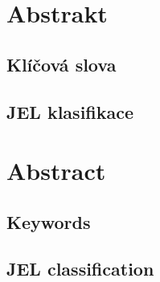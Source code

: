 \hypersetup{pageanchor=true}
\cleardoublepage
\pagestyle{plain}
\openright
\vspace*{\fill}
\section*{\PodekovaniText}
\noindent
\Podekovani
\vspace{1cm}


\openright
\section*{Abstrakt}
\noindent
\Abstrakt
\subsection*{Klíčová slova}
\noindent
\KlicovaSlova
\subsection*{JEL klasifikace}
\noindent
\JEL

\bigskip\bigskip\bigskip\bigskip\bigskip
\section*{Abstract}
\noindent
\AbstraktEN
\subsection*{Keywords}
\noindent
\KlicovaSlovaEN
\subsection*{JEL classification}
\noindent
\JEL

\openright
